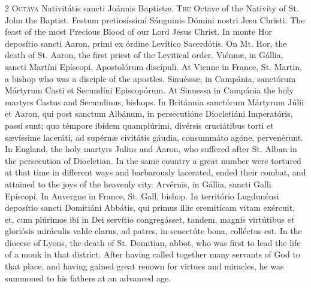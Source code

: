 \begin{paracol}{2}
\lettrine[lines=1]{O}{ctáva} Nativitátis sancti Joánnis Baptístæ.
\switchcolumn
{}
\lettrine[lines=1]{T}{he} Octave of the Nativity of St. John the Baptist.
\switchcolumn*
{}
Festum pretiosíssimi 
 Sánguinis Dómini nostri Jesu Christi.
\switchcolumn
{}
The feast of the most Precious Blood 
 of our Lord Jesus Christ.
\switchcolumn*
{}
In monte Hor deposítio 
 sancti Aaron, primi ex órdine Levítico Sacerdótis.
\switchcolumn
{}
On Mt. Hor, the death of St. Aaron, 
 the first priest of the Levitical order.
\switchcolumn*
{}
Viénnæ, in Gállia, 
 sancti Martíni Epíscopi, Apostolórum discípuli.
\switchcolumn
{}
At Vienne in France, St. Martin, a 
 bishop who was a disciple of the apostles.
\switchcolumn*
{}
Sinuéssæ, in Campánia, 
 sanctórum Mártyrum Casti et Secundíni Episcopórum.
\switchcolumn
{}
At Sinuessa in Campánia the holy 
 martyrs Castus and Secundinus, bishops.
\switchcolumn*
{}
In Británnia sanctórum 
 Mártyrum Júlii et Aaron, qui post sanctum Albánum, in persecutióne 
 Diocletiáni Imperatóris, passi sunt; quo témpore ibídem quamplúrimi, 
 divérsis cruciátibus torti et sævíssime laceráti, ad supérnæ civitátis 
 gáudia, consummáto agóne, pervenérunt.
\switchcolumn
{}
In England, the holy martyrs Julius 
 and Aaron, who suffered after St. Alban in the persecution of Diocletian. 
 In the same country a great number were tortured at that time in different 
 ways and barbarously lacerated, ended their combat, and attained to the joys 
 of the heavenly city.
\switchcolumn*
{}
Arvérnis, in Gállia, 
 sancti Galli Epíscopi.
\switchcolumn
{}
In Auvergne in France, St. Gall, 
 bishop.
\switchcolumn*
{}
In território 
 Lugdunénsi deposítio sancti Domitiáni Abbátis, qui primus illic eremitícam 
 vitam exércuit, et, cum plúrimos ibi in Dei servítio congregásset, tandem, 
 magnis virtútibus et gloriósis miráculis valde clarus, ad patres, in 
 senectúte bona, colléctus est.
\switchcolumn
{}
In the diocese of Lyons, the death 
 of St. Domitian, abbot, who was first to lead the life of a monk in that 
 district. After having called together many servants of God to that 
 place, and having gained great renown for virtues and miracles, he was 
 summoned to his fathers at an advanced age.

\end{paracol}

